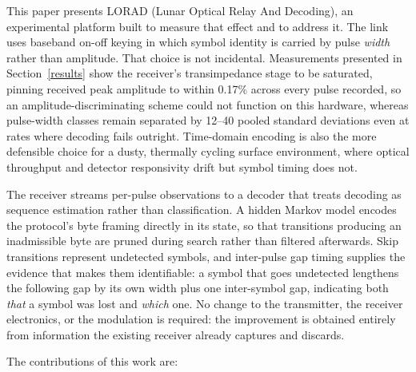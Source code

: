 This paper presents LORAD (Lunar Optical Relay And Decoding), an experimental
platform built to measure that effect and to address it. The link uses baseband
on-off keying in which symbol identity is carried by pulse \emph{width} rather
than amplitude. That choice is not incidental. Measurements presented in
Section~\ref{results} show the receiver's transimpedance stage to be saturated,
pinning received peak amplitude to within 0.17\% across every pulse recorded,
so an amplitude-discriminating scheme could not function on this hardware,
whereas pulse-width classes remain separated by 12--40 pooled standard
deviations even at rates where decoding fails outright. Time-domain
encoding is also the more defensible choice for a dusty, thermally cycling
surface environment, where optical throughput and detector responsivity drift
but symbol timing does not.

The receiver streams per-pulse observations to a decoder that treats decoding
as sequence estimation rather than classification. A hidden Markov model
encodes the protocol's byte framing directly in its state, so that transitions
producing an inadmissible byte are pruned during search rather than filtered
afterwards. Skip transitions represent undetected symbols, and inter-pulse gap
timing supplies the evidence that makes them identifiable: a symbol that goes
undetected lengthens the following gap by its own width plus one inter-symbol
gap, indicating both \emph{that} a symbol was lost and \emph{which} one. No
change to the transmitter, the receiver electronics, or the modulation is
required: the improvement is obtained entirely from information the existing
receiver already captures and discards.

The contributions of this work are:

